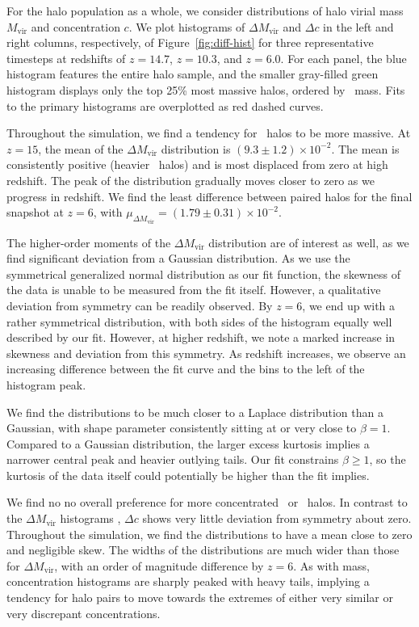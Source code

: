 For the halo population as a whole, we consider distributions of halo virial mass $M_{\mathrm{vir}}$ and concentration $c$.  We plot histograms of $\Delta M_{\mathrm{vir}}$ and $\Delta c$ in the left and right columns, respectively, of Figure~\ref{fig:diff-hist} for three representative timesteps at redshifts of $z = 14.7$, $z = 10.3$, and $z = 6.0$.  For each panel, the blue histogram features the entire halo sample, and the smaller gray-filled green histogram displays only the top 25\% most massive halos, ordered by \lpt\ mass.  Fits to the primary histograms are overplotted as red dashed curves.

Throughout the simulation, we find a tendency for \lpt\ halos to be more massive.  At $z = 15$, the mean of the $\Delta M_{\mathrm{vir}}$ distribution is $(9.3 \pm 1.2) \times 10^{-2}$.  The mean is consistently positive (heavier \lpt\ halos) and is most displaced from zero at high redshift.  The peak of the distribution gradually moves closer to zero as we progress in redshift.  We find the least difference between paired halos for the final snapshot at $z = 6$, with $\mu_{\Delta M_{\mathrm{vir}}} = (1.79 \pm 0.31) \times 10^{-2}$.

The higher-order moments of the $\Delta M_{\mathrm{vir}}$ distribution are of interest as well, as we find significant deviation from a Gaussian distribution.  As we use the symmetrical generalized normal distribution as our fit function, the skewness of the data is unable to be measured from the fit itself.  However, a qualitative deviation from symmetry can be readily observed.  By $z = 6$, we end up with a rather symmetrical distribution, with both sides of the histogram equally well described by our fit.  However, at higher redshift, we note a marked increase in skewness and deviation from this symmetry.  As redshift increases, we observe an increasing difference between the fit curve and the bins to the left of the histogram peak.

We find the distributions to be much closer to a Laplace distribution than a Gaussian, with shape parameter consistently sitting at or very close to $\beta = 1$.  Compared to a Gaussian distribution, the larger excess kurtosis implies a narrower central peak and heavier outlying tails.  Our fit constrains $\beta \geq 1$, so the kurtosis of the data itself could potentially be higher than the fit implies.

We find no no overall preference for more concentrated \lpt\ or \za\ halos.  In contrast to the $\Delta M_{\mathrm{vir}}$ histograms , $\Delta c$ shows very little deviation from symmetry about zero.  Throughout the simulation, we find the distributions to have a mean close to zero and negligible skew.  The widths of the distributions are much wider than those for $\Delta M_{\mathrm{vir}}$, with an order of magnitude difference by $z = 6$.  As with mass, concentration histograms are sharply peaked with heavy tails, implying a tendency for halo pairs to move towards the extremes of either very similar or very discrepant concentrations.




